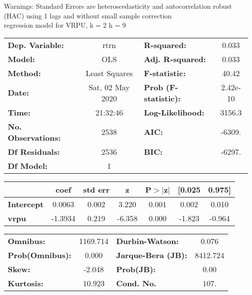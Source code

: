 Warnings: \newline
 [1] Standard Errors are heteroscedasticity and autocorrelation robust (HAC) using 1 lags and without small sample correction\\ 

regression model for VRPU, k = 2 h = 9\begin{center}
\begin{tabular}{lclc}
\toprule
\textbf{Dep. Variable:}    &       rtrn       & \textbf{  R-squared:         } &     0.033   \\
\textbf{Model:}            &       OLS        & \textbf{  Adj. R-squared:    } &     0.033   \\
\textbf{Method:}           &  Least Squares   & \textbf{  F-statistic:       } &     40.42   \\
\textbf{Date:}             & Sat, 02 May 2020 & \textbf{  Prob (F-statistic):} &  2.42e-10   \\
\textbf{Time:}             &     21:32:46     & \textbf{  Log-Likelihood:    } &    3156.3   \\
\textbf{No. Observations:} &        2538      & \textbf{  AIC:               } &    -6309.   \\
\textbf{Df Residuals:}     &        2536      & \textbf{  BIC:               } &    -6297.   \\
\textbf{Df Model:}         &           1      & \textbf{                     } &             \\
\bottomrule
\end{tabular}
\begin{tabular}{lcccccc}
                   & \textbf{coef} & \textbf{std err} & \textbf{z} & \textbf{P$> |$z$|$} & \textbf{[0.025} & \textbf{0.975]}  \\
\midrule
\textbf{Intercept} &       0.0063  &        0.002     &     3.220  &         0.001        &        0.002    &        0.010     \\
\textbf{vrpu}      &      -1.3934  &        0.219     &    -6.358  &         0.000        &       -1.823    &       -0.964     \\
\bottomrule
\end{tabular}
\begin{tabular}{lclc}
\textbf{Omnibus:}       & 1169.714 & \textbf{  Durbin-Watson:     } &    0.076  \\
\textbf{Prob(Omnibus):} &   0.000  & \textbf{  Jarque-Bera (JB):  } & 8412.724  \\
\textbf{Skew:}          &  -2.048  & \textbf{  Prob(JB):          } &     0.00  \\
\textbf{Kurtosis:}      &  10.923  & \textbf{  Cond. No.          } &     107.  \\
\bottomrule
\end{tabular}
\end{center}

